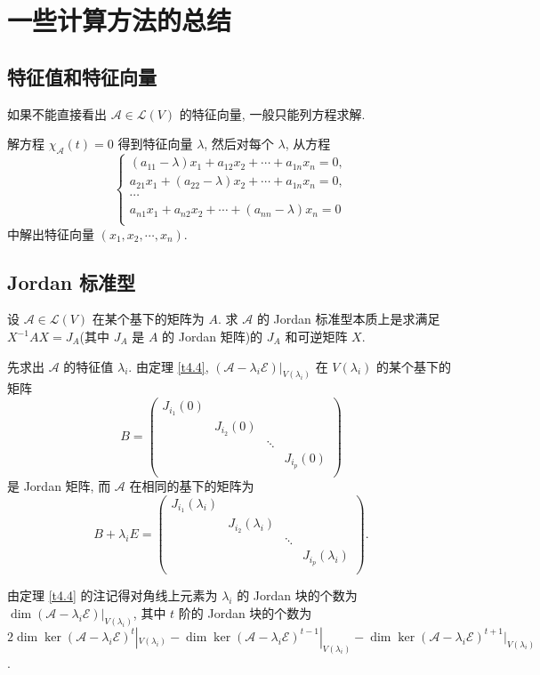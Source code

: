 \documentclass{ctexart}
\begin{document}
\section{一些计算方法的总结}
\subsection{特征值和特征向量}
如果不能直接看出 $\mathcal{A}\in\mathcal{L}(V)$ 的特征向量, 一般只能列方程求解.

解方程 $\chi_\mathcal{A}(t)=0$ 得到特征向量 $\lambda$, 然后对每个 $\lambda$, 从方程
\[\begin{cases}
    (a_{11}-\lambda)x_1+a_{12}x_2+\cdots+a_{1n}x_n=0, \\
    a_{21}x_1+(a_{22}-\lambda)x_2+\cdots+a_{1n}x_n=0, \\
    \cdots \\
    a_{n1}x_1+a_{n2}x_2+\cdots+(a_{nn}-\lambda)x_n=0 \\
\end{cases}\]
中解出特征向量 $(x_1,x_2,\cdots,x_n)$.
\subsection{Jordan 标准型}
设 $\mathcal{A}\in\mathcal{L}(V)$ 在某个基下的矩阵为 $A$. 求 $\mathcal{A}$ 的 Jordan 标准型本质上是求满足 $X^{-1}AX=J_A$(其中 $J_A$ 是 $A$ 的 Jordan 矩阵)的 $J_A$ 和可逆矩阵 $X$.

先求出 $\mathcal{A}$ 的特征值 $\lambda_i$. 由定理 \ref{t4.4}, $(\mathcal{A}-\lambda_i\mathcal{E})|_{V(\lambda_i)}$ 在 $V(\lambda_i)$ 的某个基下的矩阵
\[B=\begin{pmatrix}
    J_{i_1}(0) \\
    & J_{i_2}(0) \\
    && \ddots \\
    &&& J_{i_p}(0) \\
\end{pmatrix}\]
是 Jordan 矩阵, 而 $\mathcal{A}$ 在相同的基下的矩阵为
\[B+\lambda_iE=\begin{pmatrix}
    J_{i_1}(\lambda_i) \\
    & J_{i_2}(\lambda_i) \\
    && \ddots \\
    &&& J_{i_p}(\lambda_i) \\
\end{pmatrix}.\]

由定理 \ref{t4.4} 的注记得对角线上元素为 $\lambda_i$ 的 Jordan 块的个数为 $\dim(\mathcal{A}-\lambda_i\mathcal{E})|_{V(\lambda_i)}$, 其中 $t$ 阶的 Jordan 块的个数为 $2\dim\ker(\mathcal{A}-\lambda_i\mathcal{E})^t|_{V(\lambda_i)}-\dim\ker(\mathcal{A}-\lambda_i\mathcal{E})^{t-1}|_{V(\lambda_i)}-\dim\ker(\mathcal{A}-\lambda_i\mathcal{E})^{t+1}|_{V(\lambda_i)}$.
\end{document}
